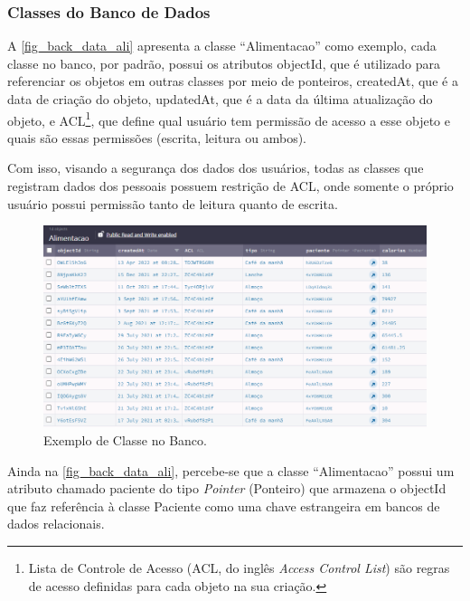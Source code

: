 \subsubsection{Classes do Banco de Dados}

A \autoref{fig_back_data_ali} apresenta a classe ``Alimentacao'' como exemplo, cada classe no banco, por padrão,
possui os atributos objectId, que é utilizado para referenciar os objetos em outras classes por
meio de ponteiros, createdAt, que é a data de criação do objeto, updatedAt, que é a data da última atualização
do objeto, e ACL\footnote{Lista de Controle de Acesso (ACL, do inglês \emph{\textit{Access Control List}})
    são regras de acesso definidas para cada objeto na sua criação.}, que define qual usuário tem permissão de acesso a
esse objeto e quais são essas permissões (escrita, leitura ou ambos).

Com isso, visando a segurança dos dados dos usuários, todas as classes que registram dados dos pessoais
possuem restrição de ACL, onde somente o próprio usuário possui permissão tanto de leitura quanto de escrita.

\begin{figure}[htb]
    \caption{\label{fig_back_data_ali}Exemplo de Classe no Banco.}
    \begin{center}
        \includegraphics[scale=0.63]{Imagens/desenvolvimento/back4app_database_alimentacao.png}
    \end{center}
\end{figure}

Ainda na \autoref{fig_back_data_ali}, percebe-se que a classe ``Alimentacao'' possui um atributo chamado paciente do tipo
\emph{Pointer} (Ponteiro) que armazena o objectId que faz referência à classe Paciente como uma chave estrangeira em
bancos de dados relacionais.

